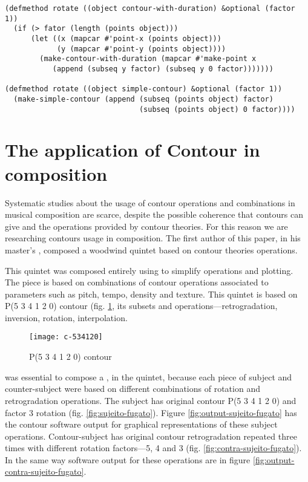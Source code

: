 \begin{figure*}
\begin{verbatim}
(defmethod rotate ((object contour-with-duration) &optional (factor 1))
  (if (> fator (length (points object)))
      (let ((x (mapcar #'point-x (points object)))
            (y (mapcar #'point-y (points object))))
        (make-contour-with-duration (mapcar #'make-point x
           (append (subseq y factor) (subseq y 0 factor)))))))

(defmethod rotate ((object simple-contour) &optional (factor 1))
  (make-simple-contour (append (subseq (points object) factor)
                               (subseq (points object) 0 factor))))
\end{verbatim}
  \caption{Multi-methods}
  \label{fig:code-methods}
\end{figure*}

\section{The application of Contour in composition}
\label{sec:cont-appl-comp}

Systematic studies about the usage of contour operations and
combinations in musical composition are scarce, despite the possible
coherence that contours can give and the operations provided by
contour theories. For this reason we are researching contours usage in
composition. The first author of this paper, in his master's
\cite{sampaio08:em}, composed a woodwind quintet based on contour
theories operations.

This quintet was composed entirely using \goiaba{} to simplify
operations and plotting. The piece is based on combinations of contour
operations associated to parameters such as pitch, tempo, density and
texture. This quintet is based on P(5 3 4 1 2 0) contour
(fig. \ref{fig:c-534120}, its subsets and operations---retrogradation,
inversion, rotation, interpolation.

\begin{figure}
  \centering
  \texttt{[image: c-534120]}
  \caption{P(5 3 4 1 2 0) contour}
  \label{fig:c-534120}
\end{figure}

\goiaba{} was essential to compose a , in the quintet,
because each piece of subject and counter-subject were based on
different combinations of rotation and retrogradation operations.  The
subject has original contour P(5 3 4 1 2 0) and factor 3 rotation
(fig. \ref{fig:sujeito-fugato}). Figure
\ref{fig:output-sujeito-fugato} has the contour software output for
graphical representations of these subject operations. Contour-subject
has original contour retrogradation repeated three times with
different rotation factors---5, 4 and 3
(fig. \ref{fig:contra-sujeito-fugato}). In the same way software
output for these operations are in figure
\ref{fig:output-contra-sujeito-fugato}.

